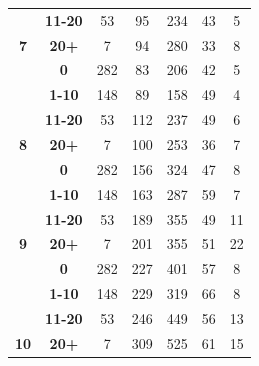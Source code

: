 \begin{table}
{\begin{tabular}{|c@{~}|c@{~}|c@{~}|c@{~}|c@{~}|c@{~}|c|}
 & \textbf{11-20} & 53 & \cellcolor[HTML]{C0C0C0}95 & 234 & \cellcolor[HTML]{C0C0C0}43 & \cellcolor[HTML]{C0C0C0}5 \\ \cline{2-7} 
\multirow{-4}{*}{\textbf{7}} & \textbf{20+} & 7 & \cellcolor[HTML]{C0C0C0}94 & 280 & \cellcolor[HTML]{C0C0C0}33 & \cellcolor[HTML]{C0C0C0}8 \\ \hline
 & \textbf{0} & 282 & \cellcolor[HTML]{C0C0C0}83 & 206 & 42 & \cellcolor[HTML]{C0C0C0}5 \\ \cline{2-7} 
 & \textbf{1-10} & 148 & \cellcolor[HTML]{C0C0C0}89 & \cellcolor[HTML]{C0C0C0}158 & \cellcolor[HTML]{C0C0C0}49 & \cellcolor[HTML]{C0C0C0}4 \\ \cline{2-7} 
 & \textbf{11-20} & 53 & 112 & 237 & \cellcolor[HTML]{C0C0C0}49 & 6 \\ \cline{2-7} 
\multirow{-4}{*}{\textbf{8}} & \textbf{20+} & 7 & \cellcolor[HTML]{C0C0C0}100 & 253 & 36 & 7 \\ \hline
 & \textbf{0} & 282 & \cellcolor[HTML]{C0C0C0}156 & 324 & 47 & \cellcolor[HTML]{C0C0C0}8 \\ \cline{2-7} 
 & \textbf{1-10} & 148 & \cellcolor[HTML]{C0C0C0}163 & \cellcolor[HTML]{C0C0C0}287 & \cellcolor[HTML]{C0C0C0}59 & \cellcolor[HTML]{C0C0C0}7 \\ \cline{2-7} 
 & \textbf{11-20} & 53 & \cellcolor[HTML]{C0C0C0}189 & 355 & \cellcolor[HTML]{C0C0C0}49 & 11 \\ \cline{2-7} 
\multirow{-4}{*}{\textbf{9}} & \textbf{20+} & 7 & \cellcolor[HTML]{C0C0C0}201 & 355 & \cellcolor[HTML]{C0C0C0}51 & 22 \\ \hline
 & \textbf{0} & 282 & \cellcolor[HTML]{C0C0C0}227 & 401 & \cellcolor[HTML]{C0C0C0}57 & \cellcolor[HTML]{C0C0C0}8 \\ \cline{2-7} 
 & \textbf{1-10} & 148 & \cellcolor[HTML]{C0C0C0}229 & \cellcolor[HTML]{C0C0C0}319 & \cellcolor[HTML]{C0C0C0}66 & \cellcolor[HTML]{C0C0C0}8 \\ \cline{2-7} 
 & \textbf{11-20} & 53 & \cellcolor[HTML]{C0C0C0}246 & 449 & \cellcolor[HTML]{C0C0C0}56 & 13 \\ \cline{2-7} 
\multirow{-4}{*}{\textbf{10}} & \textbf{20+} & 7 & \cellcolor[HTML]{C0C0C0}309 & 525 & \cellcolor[HTML]{C0C0C0}61 & 15 \\ \hline

\end{tabular}}
\end{table}
